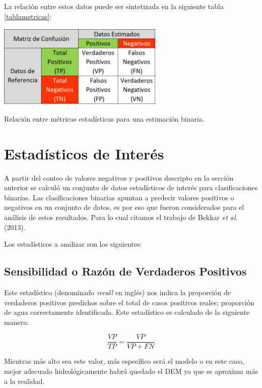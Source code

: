 \documentclass[10pt,a4paper, twoside]{report}
\begin{document}
La relación entre estos datos puede ser sintetizada en la siguiente tabla \ref{tablametricas}:

\begin{table}[H]
   \centering      
   \includegraphics[width=0.6\textwidth]{imagenes/tablametricas.jpg}
 \caption{Relación entre métricas estadísticas para una estimación binaria.}
 \label{tablametricas}
\end{table}



\section{Estadísticos de Interés}

A partir del conteo de valores negativos y positivos descripto en la sección anterior se calculó un conjunto de datos estadísticos de interés para clasificaciones binarias.  Las clasificaciones binarias apuntan a predecir valores positivos o negativos en un conjunto de datos, es por eso que fueron considerados para el análisis de estos resultados. Para lo cual citamos el trabajo de Bekkar \textit{et al.} (2013).

Los estadísticos a analizar son los siguientes:

\subsection{Sensibilidad o Razón de Verdaderos Positivos}

Este estadístico (denominado \textit{recall} en inglés) nos indica la proporción de verdaderos positivos predichos sobre el total de casos positivos reales; proporción de agua correctamente identificada. Este estadístico es calculado de la siguiente manera: 

\begin{equation}
\frac{VP}{TP}=\frac{VP}{VP + FN}
\end{equation}

Mientras más alto sea este valor, más específico será el modelo o en este caso, mejor adecuado hidrológicamente habrá quedado el DEM ya que se aproxima más a la realidad.
\end{document}
